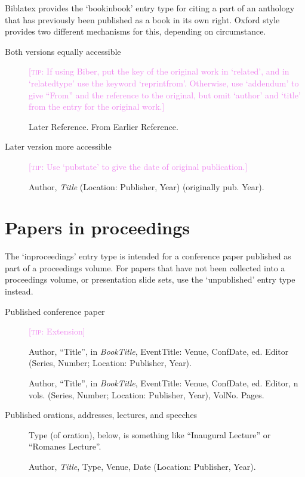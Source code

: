 \documentclass[extrafontsizes,11pt,a4paper,oneside]{memoir}
\newcommand*{\lit}[1]{\textsf{#1}}
\newcommand*{\code}[1]{`\textsf{#1}'}
\newcommand*{\aside}[1]{\textcolor{violet}{[\textsc{tip:} #1]}}
\begin{document}
Biblatex provides the \code{bookinbook} entry type for citing a part of an anthology that has previously been published as a book in its own right. Oxford style provides two different mechanisms for this, depending on circumstance.

\begin{description}
  \item[Both versions equally accessible] \aside{If using Biber, put the key of the original work in \code{related}, and in \code{relatedtype} use the keyword \code{reprintfrom}. Otherwise, use \code{addendum} to give \enquote{From} and the reference to the original, but omit \code{author} and \code{title} from the entry for the original work.}\par
  Later Reference. From Earlier Reference.
  \\
  \item[Later version more accessible] \aside{Use \code{pubstate} to give the date of original publication.}\par
  \par Author, \emph{Title} (Location: Publisher, Year) (\lit{originally pub.} Year).
  \\
\end{description}

\chapter{Papers in proceedings}\label{sec:inproceedings}

The \code{inproceedings} entry type is intended for a conference paper published as part of a proceedings volume. For papers that have not been collected into a proceedings volume, or presentation slide sets, use the \code{unpublished} entry type instead.

\begin{description}
  \item[Published conference paper] \aside{Extension}\par
  Author, \enquote{Title}, \lit{in} \emph{BookTitle}, EventTitle: Venue, ConfDate, \lit{ed.} Editor (Series, Number; Location: Publisher, Year).
  \\\par
  Author, \enquote{Title}, \lit{in} \emph{BookTitle}, EventTitle: Venue, ConfDate, \lit{ed.} Editor, n \lit{vols.} (Series, Number; Location: Publisher, Year), VolNo. Pages.
  \\
  
  \item[Published orations, addresses, lectures, and speeches] Type (of oration), below, is something like \enquote{Inaugural Lecture} or \enquote{Romanes Lecture}.\par Author, \emph{Title}, Type, Venue, Date (Location: Publisher, Year).
  \\
\end{description}
\end{document}
